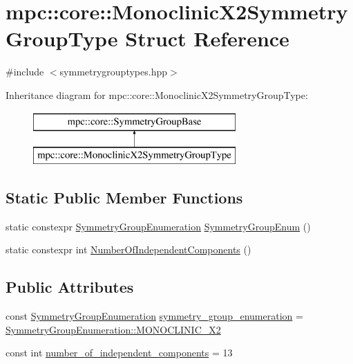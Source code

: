 \hypertarget{structmpc_1_1core_1_1_monoclinic_x2_symmetry_group_type}{}\section{mpc\+:\+:core\+:\+:Monoclinic\+X2\+Symmetry\+Group\+Type Struct Reference}
\label{structmpc_1_1core_1_1_monoclinic_x2_symmetry_group_type}


{\ttfamily \#include $<$symmetrygrouptypes.\+hpp$>$}

Inheritance diagram for mpc\+:\+:core\+:\+:Monoclinic\+X2\+Symmetry\+Group\+Type\+:\begin{figure}[H]
\begin{center}
\leavevmode
\includegraphics[height=2.000000cm]{structmpc_1_1core_1_1_monoclinic_x2_symmetry_group_type}
\end{center}
\end{figure}
\subsection*{Static Public Member Functions}
\begin{DoxyCompactItemize}
\item 
static constexpr \mbox{\hyperlink{namespacempc_1_1core_a9d979684062547055a0ef5c13077bad8}{Symmetry\+Group\+Enumeration}} \mbox{\hyperlink{structmpc_1_1core_1_1_monoclinic_x2_symmetry_group_type_a23156166d016e06f3f11ab523e07a220}{Symmetry\+Group\+Enum}} ()
\item 
static constexpr int \mbox{\hyperlink{structmpc_1_1core_1_1_monoclinic_x2_symmetry_group_type_a3ab5eeb5ea4262e6cb99e35a593748c8}{Number\+Of\+Independent\+Components}} ()
\end{DoxyCompactItemize}
\subsection*{Public Attributes}
\begin{DoxyCompactItemize}
\item 
const \mbox{\hyperlink{namespacempc_1_1core_a9d979684062547055a0ef5c13077bad8}{Symmetry\+Group\+Enumeration}} \mbox{\hyperlink{structmpc_1_1core_1_1_monoclinic_x2_symmetry_group_type_ab63d007354c1eb9346023d74ac74e50b}{symmetry\+\_\+group\+\_\+enumeration}} = \mbox{\hyperlink{namespacempc_1_1core_a9d979684062547055a0ef5c13077bad8a7eb6e11f17e97fbe9fc371a72a989b96}{Symmetry\+Group\+Enumeration\+::\+M\+O\+N\+O\+C\+L\+I\+N\+I\+C\+\_\+\+X2}}
\item 
const int \mbox{\hyperlink{structmpc_1_1core_1_1_monoclinic_x2_symmetry_group_type_a3036efe4ed2f2ba0bf98269538d4be67}{number\+\_\+of\+\_\+independent\+\_\+components}} = 13
\end{DoxyCompactItemize}


